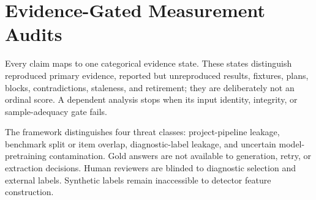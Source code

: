 \section{Evidence-Gated Measurement Audits}

Every claim maps to one categorical evidence state. These states distinguish reproduced primary
evidence, reported but unreproduced results, fixtures, plans, blocks, contradictions, staleness, and
retirement; they are deliberately not an ordinal score. A dependent analysis stops when its input
identity, integrity, or sample-adequacy gate fails.

The framework distinguishes four threat classes: project-pipeline leakage, benchmark split or item
overlap, diagnostic-label leakage, and uncertain model-pretraining contamination. Gold answers are
not available to generation, retry, or extraction decisions. Human reviewers are blinded to
diagnostic selection and external labels. Synthetic labels remain inaccessible to detector feature
construction.


